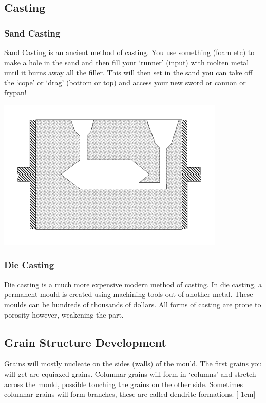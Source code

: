 \documentclass[12pt]{article}
\begin{document}
\subsection{Casting}
\subsubsection{Sand Casting}
Sand Casting is an ancient method of casting. 
You use something (foam etc) to make a hole in the sand and then fill your `runner' (input) with molten metal until it burns away all the filler.
This will then set in the sand you can take off the `cope' or `drag' (bottom or top) and access your new sword or cannon or frypan!

\begin{center}
\includegraphics[scale=0.8]{sandcasting}
\end{center}
\subsubsection{Die Casting}
Die casting is a much more expensive modern method of casting.
In die casting, a permanent mould is created using machining tools out of another metal.
These moulds can be hundreds of thousands of dollars.
All forms of casting are prone to porosity however, weakening the part.

\subsection{Grain Structure Development}
Grains will mostly nucleate on the sides (walls) of the mould.
The first grains you will get are equiaxed grains.
Columnar grains will form in `columns' and stretch across the mould, possible touching the grains on the other side.
Sometimes columnar grains will form branches, these are called dendrite formations.
[-1cm]
\end{document}

